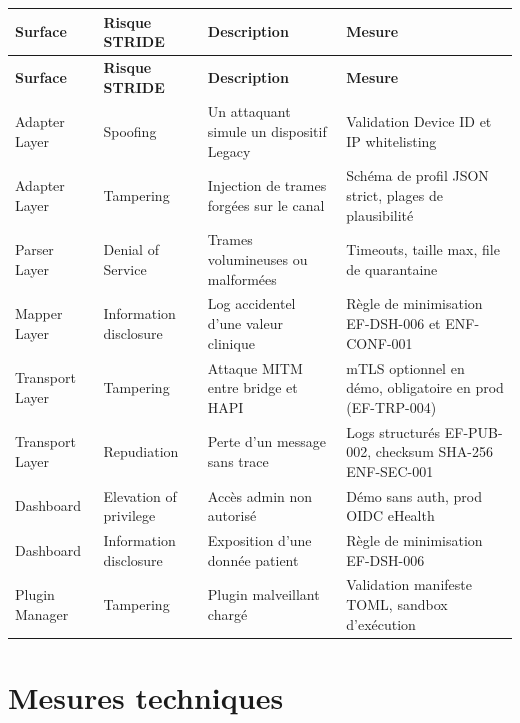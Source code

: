 \bridgezebra
\begin{longtable}{p{2.8cm}p{2.5cm}p{4.5cm}p{4.2cm}}
  \toprule
  \rowcolor{bridgeblue!90}
  {\color{white}\bfseries Surface} & {\color{white}\bfseries Risque STRIDE} & {\color{white}\bfseries Description} & {\color{white}\bfseries Mesure} \\
  \midrule
  \endfirsthead
  \toprule
  \rowcolor{bridgeblue!90}
  {\color{white}\bfseries Surface} & {\color{white}\bfseries Risque STRIDE} & {\color{white}\bfseries Description} & {\color{white}\bfseries Mesure} \\
  \midrule
  \endhead
  \bottomrule
  \endfoot
  Adapter Layer    & Spoofing               & Un attaquant simule un dispositif Legacy        & Validation Device ID et IP whitelisting \\
  Adapter Layer    & Tampering              & Injection de trames forgées sur le canal        & Schéma de profil JSON strict, plages de plausibilité \\
  Parser Layer     & Denial of Service      & Trames volumineuses ou malformées               & Timeouts, taille max, file de quarantaine \\
  Mapper Layer     & Information disclosure & Log accidentel d'une valeur clinique            & Règle de minimisation EF-DSH-006 et ENF-CONF-001 \\
  Transport Layer  & Tampering              & Attaque MITM entre bridge et HAPI               & mTLS optionnel en démo, obligatoire en prod (EF-TRP-004) \\
  Transport Layer  & Repudiation            & Perte d'un message sans trace                   & Logs structurés EF-PUB-002, checksum SHA-256 ENF-SEC-001 \\
  Dashboard        & Elevation of privilege & Accès admin non autorisé                        & Démo sans auth, prod OIDC eHealth \\
  Dashboard        & Information disclosure & Exposition d'une donnée patient                 & Règle de minimisation EF-DSH-006 \\
  Plugin Manager   & Tampering              & Plugin malveillant chargé                       & Validation manifeste TOML, sandbox d'exécution \\
\end{longtable}

\section{Mesures techniques}
\label{sec:securite-mesures-techniques}

